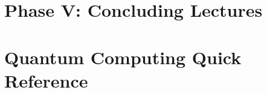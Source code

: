 \documentclass{report}
\begin{document}
\chapter{Phase V: Concluding Lectures}



\chapter{Quantum Computing Quick Reference}



\begin{appendices}\label{sec:Appendix}
  \printindex
\end{appendices}

\end{document}
